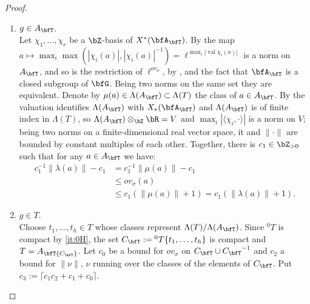 \documentclass[12pt,a4paper]{amsart}%
\newcommand{\RamiC}[1]{{{#1}}}
\begin{document}
\begin{proof}
$ $
\begin{enumerate}[{Case} 1.]
    \item \RamiC{$g\in A_\bfT$}.\\
     Let $\chi_1,\dots,\chi_r$ be a $\Z$-basis of $X^*(\bfA_\bfT)$. By
\cite[Example 18.2]{Kot} the map
$a\mapsto\max_i\max(|\chi_i(a)|,|\chi_i(a)|^{-1})=\ell^{\max_i|\operatorname{val}\chi_i(a)|}$ is a
norm on $A_\bfT$, and so is the restriction of $\ell^{ov_\sigma}$, by ,
 and the fact that $\bfA_\bfT$ is a closed subgroup of $\bfG$. Being two
norms on the same set they are equivalent. Denote by $\mu(a)\in\Lambda(A_\bfT)\subset\Lambda(T)$
the class of $a\in A_\bfT$. By \cite[V.2.6]{Ren} the valuation identifies $\Lambda(A_\bfT)$ with
$X_*(\bfA_\bfT)$ and $\Lambda(A_\bfT)$ is of finite index in $\Lambda(T)$, so
$\Lambda(A_\bfT)\otimes_\Z\R=V$ and $\max_i|\langle\chi_i,\cdot\rangle|$ is a norm on $V$;
being two norms on a finite-dimensional real vector space, it and $\|\cdot\|$ are bounded by
constant multiples of each other. Together, there is $c_1\in\Z_{>0}$ \RamiC{such that for any $a\in A_\bfT$ we have:}
\begin{equation}\label{eq:ovsigma.split}
\begin{split}
\RamiC{c_1^{-1}\|\lambda(a)\|-c_1}&=c_1^{-1}\|\mu(a)\|-c_1\\
&\leq ov_\sigma(a)\\
&\leq c_1(\|\mu(a)\|+1)=\RamiC{c_1(\|\lambda(a)\|+1)}.
\end{split}
\end{equation}
\item \RamiC{$g\in T$}.\\
 Choose $t_1,\dots,t_h\in T$ whose classes represent
$\Lambda(T)/\Lambda(A_\bfT)$. Since ${}^0T$ is compact by \eqref{it:0H}, the
set $\RamiC{C_\bfT}:={}^0T\{t_1,\dots,t_h\}$ is compact and $T=A_\bfT {\RamiC{C_\bfT}}$. Let $c_0$ be a bound for $ov_\sigma$
on ${\RamiC{C_\bfT}}\cup {\RamiC{C_\bfT}}^{-1}$ and $c_2$ a bound for $\|\nu\|$, $\nu$ running over the classes of the elements
of ${\RamiC{C_\bfT}}$.
\RamiC{Put $c_3:=\lceil c_1 c_2+c_1+c_0\rceil$.}


\end{enumerate}
\end{proof}
\end{document}
